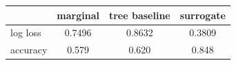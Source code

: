 \begin{tabular}{lccc}
\toprule
 & marginal & tree baseline & surrogate \\
\midrule
log loss & 0.7496 & 0.8632 & 0.3809 \\
accuracy & 0.579 & 0.620 & 0.848 \\
\bottomrule
\end{tabular}
